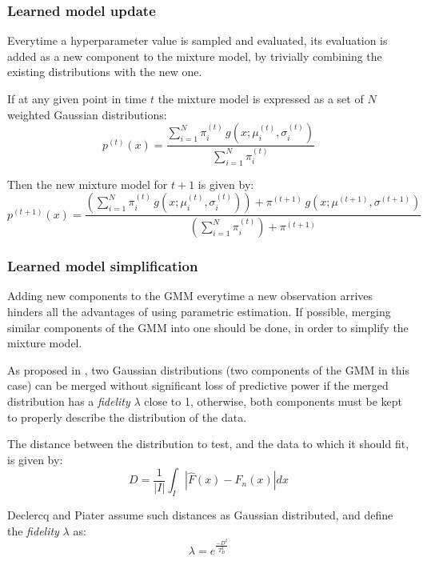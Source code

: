 	\subsubsection{Learned model update}
	Everytime a hyperparameter value is sampled and evaluated, its evaluation is added as a new
	component to the mixture model, by trivially combining the existing distributions with the new
	one.

	If at any given point in time $t$ the mixture model is expressed as a set of $N$ weighted
	Gaussian distributions:
	\begin{equation}
		p^{(t)}(x) =
			\frac
			{\sum_{i=1}^N \pi_i^{(t)}\,g(x; \mu_i^{(t)}, \sigma_i^{(t)})}
			{\sum_{i=1}^N \pi_i^{(t)}}
	\end{equation}

	Then the new mixture model for $t+1$ is given by:
	\begin{equation}
		\label{eq:merge_gaussians}
		p^{(t+1)}(x) =
		\frac
		{\left( \sum_{i=1}^N \pi_i^{(t)} \, g(x; \mu_i^{(t)}, \sigma_i^{(t)}) \right) +
		\pi^{(t+1)} \, g(x; \mu^{(t+1)}, \sigma^{(t+1)})}
		{\left(\sum_{i=1}^N \pi_i^{(t)} \right) + \pi^{(t+1)}}
	\end{equation}

	\subsubsection{Learned model simplification}
	Adding new components to the GMM everytime a new observation arrives hinders all the advantages
	of using parametric estimation. If possible, merging similar components of the GMM into one
	should be done, in order to simplify the mixture model.

	As proposed in \cite{declercq2008online}, two Gaussian distributions (two components of the GMM in
	this case) can be merged without significant loss of predictive power if the merged distribution
	has a \emph{fidelity} $\lambda$ close to 1, otherwise, both components must be kept to
	properly describe the distribution of the data.

	The distance between the distribution to test, and the data to which it should fit, is given by:
	\begin{equation}
		D = \frac 1 {|I|} \int_I \left| \hat{F}(x) - F_n(x)\right| dx
	\end{equation}

	Declercq and Piater assume such distances as Gaussian distributed, and define the
	\emph{fidelity} $\lambda$ as:
	\begin{equation}
		\lambda = e^{\frac{-D^2}{T_D^2}}
	\end{equation}

